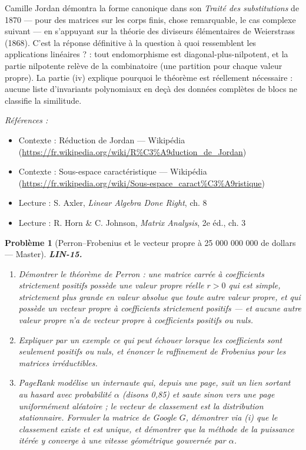 \documentclass[11pt]{article}
\newtheorem{problem}{Problème}
\newenvironment{refs}{\par\small\noindent\emph{Références :}\begin{itemize}\setlength\itemsep{0pt}}{\end{itemize}\normalsize}
\begin{document}
\noindent Camille Jordan démontra la forme canonique dans son \textit{Traité des
substitutions} de 1870 --- pour des matrices sur les corps finis, chose remarquable, le cas complexe
suivant --- en s'appuyant sur la théorie des diviseurs élémentaires de Weierstrass (1868). C'est la
réponse définitive à la question \og{} à quoi ressemblent les applications linéaires ? \fg{} : tout
endomorphisme est diagonal-plus-nilpotent, et la partie nilpotente relève de la combinatoire (une
partition pour chaque valeur propre). La partie (iv) explique pourquoi le théorème est réellement
nécessaire : aucune liste d'invariants polynomiaux en deçà des données complètes de blocs ne classifie
la similitude.

\begin{refs}
\item Contexte : Réduction de Jordan --- Wikipédia (\url{https://fr.wikipedia.org/wiki/R%C3%A9duction_de_Jordan})
\item Contexte : Sous-espace caractéristique --- Wikipédia (\url{https://fr.wikipedia.org/wiki/Sous-espace_caract%C3%A9ristique})
\item Lecture : S. Axler, \textit{Linear Algebra Done Right}, ch. 8
\item Lecture : R. Horn \& C. Johnson, \textit{Matrix Analysis}, 2e éd., ch. 3
\end{refs}

\bigskip

\begin{problem}[{Perron--Frobenius et le vecteur propre à 25 000 000 000 de dollars --- Master}]
\textbf{LIN-15.} \begin{enumerate}
\item[(i)] Démontrer le théorème de Perron : une matrice carrée à
coefficients strictement positifs possède une valeur propre réelle $r > 0$ qui est simple,
strictement plus grande en valeur absolue que toute autre valeur propre, et qui possède un vecteur
propre à coefficients strictement positifs --- et aucune autre valeur propre n'a de vecteur propre à
coefficients positifs ou nuls.
\item[(ii)] Expliquer par un exemple ce qui peut échouer
lorsque les coefficients sont seulement positifs ou nuls, et énoncer le raffinement de Frobenius pour
les matrices irréductibles.
\item[(iii)] PageRank modélise un internaute qui, depuis une page, suit un lien sortant au hasard avec
probabilité $\alpha$ (disons 0,85) et saute sinon vers une page uniformément aléatoire ; le vecteur
de classement est la distribution stationnaire. Formuler la \og{} matrice de Google \fg{} $G$, démontrer via
(i) que le classement existe et est unique, et démontrer que la méthode de la puissance itérée y
converge à une vitesse géométrique gouvernée par $\alpha$.
\end{enumerate}

\end{problem}
\end{document}
